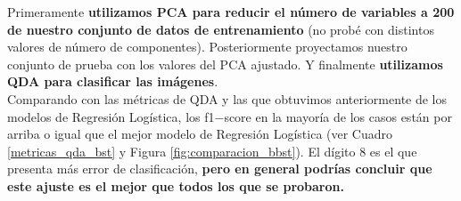 \documentclass[paper=letter, fontsize=11pt]{scrartcl}
\numberwithin{equation}{section} %
\numberwithin{figure}{section} %
\numberwithin{table}{section} %
\begin{document}
Primeramente \textbf{utilizamos PCA para reducir el número de variables a 200 de nuestro conjunto de datos de entrenamiento} (no probé con distintos valores de número de componentes). Posteriormente proyectamos nuestro conjunto de prueba con los valores del PCA ajustado. Y finalmente \textbf{utilizamos QDA para clasificar las imágenes}. \\

Comparando con las métricas de QDA y las que obtuvimos anteriormente de los modelos de Regresión Logística, los f1$-$score en la mayoría de los casos están por arriba o igual que el mejor modelo de Regresión Logística (ver Cuadro \ref{metricas_qda_bst} y Figura \ref{fig:comparacion_bbst}). 
El dígito 8 es el que presenta más error de clasificación, \textbf{pero en general podrías concluir que este ajuste es el mejor que todos los que se probaron.}
\end{document}
